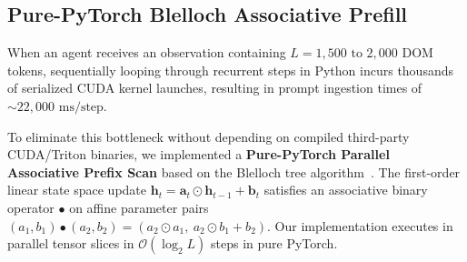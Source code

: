 \documentclass[10pt,twocolumn,letterpaper]{article}
\begin{document}
\begin{table}[t]
\centering
\small
{}
\caption{\textbf{JED-M2 Parameter Accounting.} Top-2 MoE routing achieves the representation capacity of a 53.04M network while expending the compute of only 24.07M parameters (54.6\% compute sparsity).}
\label{tab:params}
\end{table}

\subsection{Pure-PyTorch Blelloch Associative Prefill}

When an agent receives an observation containing $L = 1{,}500\text{ to }2{,}000$ DOM tokens, sequentially looping through recurrent steps in Python incurs thousands of serialized CUDA kernel launches, resulting in prompt ingestion times of $\sim 22{,}000\text{ ms/step}$.

To eliminate this bottleneck without depending on compiled third-party CUDA/Triton binaries, we implemented a \textbf{Pure-PyTorch Parallel Associative Prefix Scan} based on the Blelloch tree algorithm~\cite{blelloch1990prefix}. The first-order linear state space update $\mathbf{h}_t = \mathbf{a}_t \odot \mathbf{h}_{t-1} + \mathbf{b}_t$ satisfies an associative binary operator $\bullet$ on affine parameter pairs $(a_1, b_1) \bullet (a_2, b_2) = (a_2 \odot a_1, \ a_2 \odot b_1 + b_2)$. Our implementation executes in parallel tensor slices in $\mathcal{O}(\log_2 L)$ steps in pure PyTorch.
\end{document}
